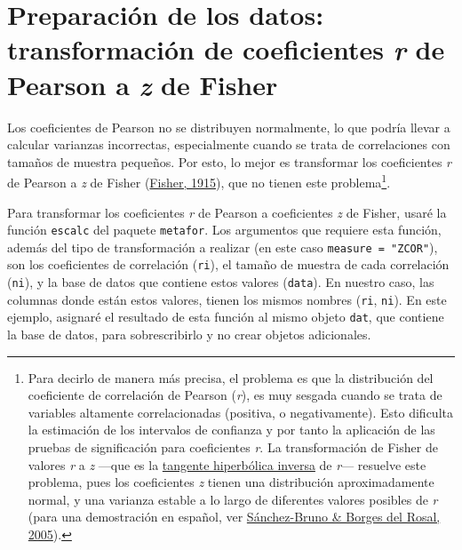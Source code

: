 \documentclass[
  bookmarksnumbered]{article}
\begin{document}
\hypertarget{preparaciuxf3n-de-los-datos-transformaciuxf3n-de-coeficientes-r-de-pearson-a-z-de-fisher}{%
\section{\texorpdfstring{Preparación de los datos: transformación de coeficientes \emph{r} de Pearson a \emph{z} de Fisher}{Preparación de los datos: transformación de coeficientes r de Pearson a z de Fisher}}\label{preparaciuxf3n-de-los-datos-transformaciuxf3n-de-coeficientes-r-de-pearson-a-z-de-fisher}}

Los coeficientes de Pearson no se distribuyen normalmente, lo que podría llevar a calcular varianzas incorrectas, especialmente cuando se trata de correlaciones con tamaños de muestra pequeños. Por esto, lo mejor es transformar los coeficientes \emph{r} de Pearson a \emph{z} de Fisher (\protect\hyperlink{ref-fisherFrequencyDistributionValues1915}{Fisher, 1915}), que no tienen este problema\footnote{Para decirlo de manera más precisa, el problema es que la distribución del coeficiente de correlación de Pearson (\emph{r}), es muy sesgada cuando se trata de variables altamente correlacionadas (positiva, o negativamente). Esto dificulta la estimación de los intervalos de confianza y por tanto la aplicación de las pruebas de significación para coeficientes \emph{r}. La transformación de Fisher de valores \emph{r} a \emph{z} ---que es la \href{https://es.wikipedia.org/wiki/Tangente_hiperb\%C3\%B3lica}{tangente hiperbólica inversa} de \emph{r}--- resuelve este problema, pues los coeficientes \emph{z} tienen una distribución aproximadamente normal, y una varianza estable a lo largo de diferentes valores posibles de \emph{r} (para una demostración en español, ver \protect\hyperlink{ref-sanchez-brunoTransformacionFisherPara2005}{Sánchez-Bruno \& Borges del Rosal, 2005}).}.

Para transformar los coeficientes \emph{r} de Pearson a coeficientes \emph{z} de Fisher, usaré la función \texttt{escalc} del paquete \texttt{metafor}. Los argumentos que requiere esta función, además del tipo de transformación a realizar (en este caso \texttt{measure\ =\ "ZCOR"}), son los coeficientes de correlación (\texttt{ri}), el tamaño de muestra de cada correlación (\texttt{ni}), y la base de datos que contiene estos valores (\texttt{data}). En nuestro caso, las columnas donde están estos valores, tienen los mismos nombres (\texttt{ri}, \texttt{ni}). En este ejemplo, asignaré el resultado de esta función al mismo objeto \texttt{dat}, que contiene la base de datos, para sobrescribirlo y no crear objetos adicionales.
\end{document}
